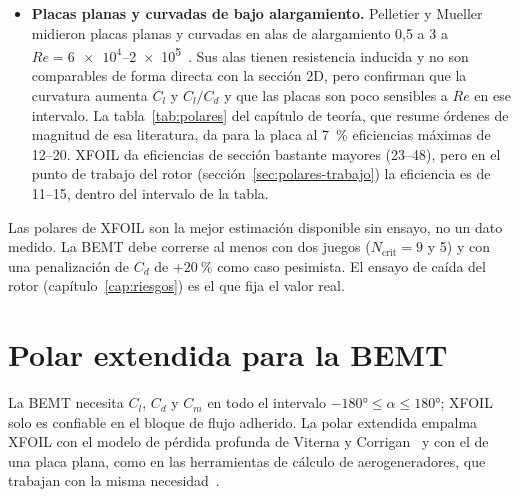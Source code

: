 \begin{itemize}
        entre \num{35000} y \num{50000}. Las placas finas no tienen esa caída porque la
        separación queda fijada en el borde de ataque o cerca de él.
  \item \textbf{Placas planas y curvadas de bajo alargamiento.} Pelletier y Mueller
        midieron placas planas y curvadas en alas de alargamiento 0,5 a 3 a
        $Re=\num{6e4}$--\num{2e5}~\cite{pelletier2000}. Sus alas tienen resistencia
        inducida y no son comparables de forma directa con la sección 2D, pero confirman
        que la curvatura aumenta $C_l$ y $C_l/C_d$ y que las placas son poco sensibles a
        $Re$ en ese intervalo. La tabla~\ref{tab:polares} del capítulo de teoría, que
        resume órdenes de magnitud de esa literatura, da para la placa al
        \SI{7}{\percent} eficiencias máximas de 12--20. XFOIL da eficiencias de sección
        bastante mayores (23--48), pero en el punto de trabajo del rotor
        (sección~\ref{sec:polares-trabajo}) la eficiencia es de 11--15, dentro del
        intervalo de la tabla.
\end{itemize}

\begin{nota}
Las polares de XFOIL son la mejor estimación disponible sin ensayo, no un dato medido. La
BEMT debe correrse al menos con dos juegos ($N_{\text{crit}}=9$ y 5) y con una penalización
de $C_d$ de $+\SI{20}{\percent}$ como caso pesimista. El ensayo de caída del rotor
(capítulo~\ref{cap:riesgos}) es el que fija el valor real.
\end{nota}


\section{Polar extendida para la BEMT}\label{sec:polares-ext}

La BEMT necesita $C_l$, $C_d$ y $C_m$ en todo el intervalo $\ang{-180}\le\alpha\le\ang{180}$;
XFOIL solo es confiable en el bloque de flujo adherido. La polar extendida empalma XFOIL
con el modelo de pérdida profunda de Viterna y Corrigan~\cite{polares-viterna1982} y con
el de una placa plana, como en las herramientas de cálculo de aerogeneradores, que
trabajan con la misma necesidad~\cite{polares-spera2008}.

